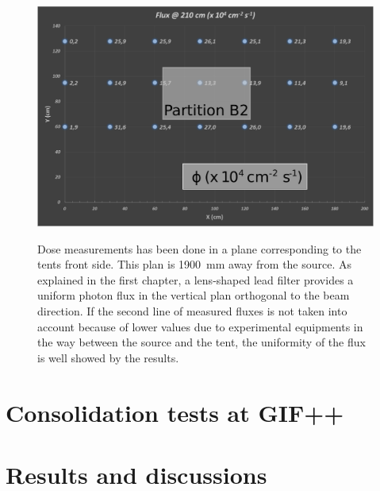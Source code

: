 			\begin{figure}[!h]
				\begin{center}
					\includegraphics[width = \plotwidth]{fig/GIF-fluxes.pdf}\\
					\caption{\label{fig:Dose} Dose measurements has been done in a plane corresponding to the tents front side. This plan is \SI{1900}{\mm} away from the source. As explained in the first chapter, a lens-shaped lead filter provides a uniform photon flux in the vertical plan orthogonal to the beam direction. If the second line of measured fluxes is not taken into account because of lower values due to experimental equipments in the way between the source and the tent, the uniformity of the flux is well showed by the results.}
				\end{center}
			\end{figure}

\section{Consolidation tests at GIF++}
\label{sec:GIFtests}

\section{Results and discussions}
\label{sec:results6}

